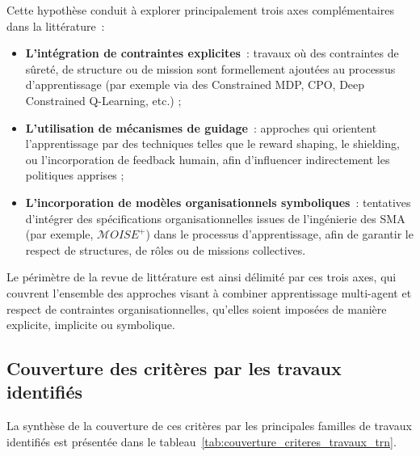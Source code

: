 Cette hypothèse conduit à explorer principalement trois axes complémentaires dans la littérature~:
\begin{itemize}
  \item \textbf{L’intégration de contraintes explicites}~: travaux où des contraintes de sûreté, de structure ou de mission sont formellement ajoutées au processus d’apprentissage (par exemple via des Constrained MDP, CPO, Deep Constrained Q-Learning, etc.) ;
  \item \textbf{L’utilisation de mécanismes de guidage}~: approches qui orientent l’apprentissage par des techniques telles que le reward shaping, le shielding, ou l’incorporation de feedback humain, afin d’influencer indirectement les politiques apprises ;
  \item \textbf{L’incorporation de modèles organisationnels symboliques}~: tentatives d’intégrer des spécifications organisationnelles issues de l’ingénierie des SMA (par exemple, $\mathcal{M}OISE^+$) dans le processus d’apprentissage, afin de garantir le respect de structures, de rôles ou de missions collectives.
\end{itemize}

Le périmètre de la revue de littérature est ainsi délimité par ces trois axes, qui couvrent l’ensemble des approches visant à combiner apprentissage multi-agent et respect de contraintes organisationnelles, qu’elles soient imposées de manière explicite, implicite ou symbolique.

\subsection*{Couverture des critères par les travaux identifiés}

La synthèse de la couverture de ces critères par les principales familles de travaux identifiés est présentée dans le tableau~\ref{tab:couverture_criteres_travaux_trn}.

